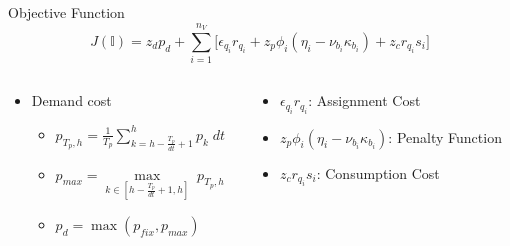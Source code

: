 \documentclass[aspectratio=169]{beamer}
\begin{document}
\begin{frame}[label={sec:org8722e39}]{Objective Function}
\begin{equation*}
  J(\mathbb{I}) = z_d p_d + \sum_{i=1}^{n_V} \Big[ \epsilon_{q_i}r_{q_i} + z_p \phi_i(\eta_i - \nu_{b_i} \kappa_{b_i}) + z_c r_{q_i} s_i \Big]
\end{equation*}

\begin{columns}
\begin{column}{0.5\columnwidth}
\begin{itemize}
\item Demand cost
\begin{itemize}
\item \(p_{T_p,h} = \frac{1}{T_p} \sum_{k = h-\frac{T_p}{dt}+1}^h p_k\; dt\)
\item \(p_{max} = \max\limits_{k \in [h-\frac{T_p}{dt}+1, h]}\; p_{T_p,h}\)
\item \(p_d = \max(p_{fix}, p_{max})\)
\end{itemize}
\end{itemize}
\end{column}

\begin{column}{0.5\columnwidth}
\begin{itemize}
\item \(\epsilon_{q_i}r_{q_i}\): Assignment Cost
\item \(z_p \phi_i(\eta_i - \nu_{b_i} \kappa_{b_i})\): Penalty Function
\item \(z_c r_{q_i} s_i\): Consumption Cost
\end{itemize}
\end{column}
\end{columns}
\end{frame}
\end{document}
